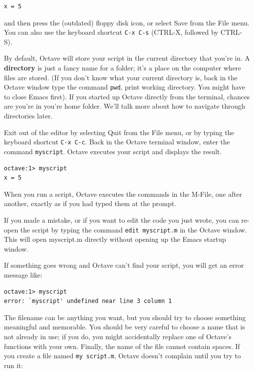 \documentclass{book}
\begin{document}
\begin{verbatim}
x = 5
\end{verbatim}

and then press the (outdated) floppy disk icon, or select {\sf Save}
from the {\sf File} menu. You can also use the keyboard shortcut {\tt C-x C-s}
(CTRL-X, followed by CTRL-S).

By default, Octave will store your script in the current directory that
you're in. A {\bf directory} is just a fancy name for a folder; it's a place
on the computer where files are stored. (If you don't know what your current
directory is, back in the
Octave window type the command {\tt pwd}, print working directory. You might
have to close Emacs first). If you started up Octave directly from the terminal,
chances are you're in you're home folder. We'll talk more about how to navigate
through directories later.

Exit out of the editor by selecting {\sf Quit} from the {\sf File} menu, or by
typing the keyboard shortcut {\tt C-x C-c}. Back in the Octave terminal window,
enter the command {\tt myscript}. Octave executes your script and displays
the result.

\begin{verbatim}
octave:1> myscript
x = 5
\end{verbatim}

When you run a script, Octave executes the commands in the M-File, one
after another, exactly as if you had typed them at the prompt.

If you made a mistake, or if you want to edit the code you just wrote, you can
re-open the script by typing the command {\tt edit myscript.m} in the Octave
window. This will open myscript.m directly without opening up the Emacs startup
window.

If something goes wrong and Octave can't find your script, you will
get an error message like:

\begin{verbatim}
octave:1> myscript
error: `myscript' undefined near line 3 column 1
\end{verbatim}

The filename can be anything you want, but you should try to choose
something meaningful and memorable. You should be very careful to choose a
name that is not already in use; if you do, you might accidentally
replace one of Octave's functions with your own.
Finally, the name of the file cannot contain spaces. If you create
a file named {\tt my script.m}, Octave doesn't complain until you try
to run it:
\end{document}
